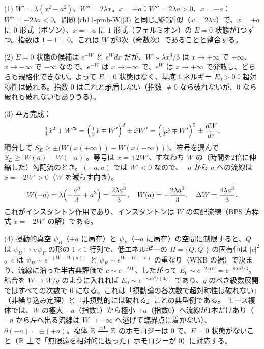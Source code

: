 \begin{solution}
(1) $W'=\lambda(x^2-a^2)$、$W''=2\lambda x$。$x=+a$：$W''=2\lambda a>0$、$x=-a$：$W''=-2\lambda a<0$。問題 \ref{ch11-prob-W}(3) と同じ調和近似（$\omega=2\lambda a$）で、$x=+a$ に $0$ 形式（ボソン）、$x=-a$ に $1$ 形式（フェルミオン）の $E=0$ 状態が1つずつ。指数は $1-1=0$。これは $W$ が3次（奇数次）であることと整合する。

(2) $E=0$ 状態の候補は $e^{-W}$ と $e^{W}dx$ だが、$W\sim\lambda x^3/3$ は $x\to+\infty$ で $+\infty$、$x\to-\infty$ で $-\infty$ なので、$e^{-W}$ は $x\to-\infty$ で、$e^W$ は $x\to+\infty$ で発散し、どちらも規格化できない。よって $E=0$ 状態はなく、基底エネルギー $E_0>0$：超対称性は破れる。指数 $0$ はこれと矛盾しない（指数 $\neq0$ なら破れないが、$0$ なら破れも破れないもありうる）。

(3) 平方完成：
\[
\tfrac14\dot x^2+W'^2=\Bigl(\tfrac12\dot x\mp W'\Bigr)^2\pm\dot xW'=\Bigl(\tfrac12\dot x\mp W'\Bigr)^2\pm\frac{dW}{d\tau}.
\]
積分して $S_E\ge\pm\bigl(W(x(+\infty))-W(x(-\infty))\bigr)$、符号を選んで $S_E\ge\lvert W(a)-W(-a)\rvert$。等号は $\dot x=\pm2W'$、すなわち $W$ の（時間を2倍に伸縮した）勾配流のとき。$(-a,a)$ では $W'<0$ なので、$-a$ から $a$ への流線は $\dot x=-2W'>0$（$W$ を減らす向き）。
\[
W(-a)=\lambda\Bigl(-\frac{a^3}3+a^3\Bigr)=\frac{2\lambda a^3}{3},\quad W(a)=-\frac{2\lambda a^3}3,\quad \Delta W=\frac{4\lambda a^3}{3}.
\]
これがインスタントン作用であり、インスタントンは $W$ の勾配流線（BPS 方程式 $\dot x=-2W'$ の解）である。

(4) 摂動的真空 $\psi_B$（$+a$ に局在）と $\psi_F$（$-a$ に局在）の空間に制限すると、$Q$ は $\psi_B\mapsto c\,\psi_F$ の形の $1\times1$ 行列で、低エネルギーの $H=\{Q,Q^\dagger\}$ の固有値は $\lvert c\rvert^2$。$c$ は $\psi_B\sim e^{-(W-W(a))}$ と $\psi_F\sim e^{W-W(-a)}$ の重なり（WKB の裾）で決まり、流線に沿った半古典評価で $c\sim e^{-\Delta W}$、したがって $E_0\sim e^{-2\Delta W}=e^{-8\lambda a^3/3}$。結合を $W\to W/g$ のように入れれば $E_0\sim e^{-8\lambda a^3/(3g)}$ であり、$g$ のべき級数展開ではすべての次数で $0$ になる。これは「摂動論の各次数で超対称性は破れない」（非繰り込み定理）と「非摂動的には破れる」ことの典型例である。
モース複体では、$W$ の極大 $-a$（指数1）から極小 $+a$（指数0）へ流線が1本だけあり（$-a$ から左へ出る流線は $W\to-\infty$ へ逃げて臨界点に着かない）、$\partial(-a)=\pm(+a)$。複体 $\mathbb{Z}\xrightarrow{\pm1}\mathbb{Z}$ のホモロジーは $0$ で、$E=0$ 状態がないこと（$\mathbb{R}$ 上で「無限遠を相対的に扱った」ホモロジーが $0$）に対応する。
\end{solution}

